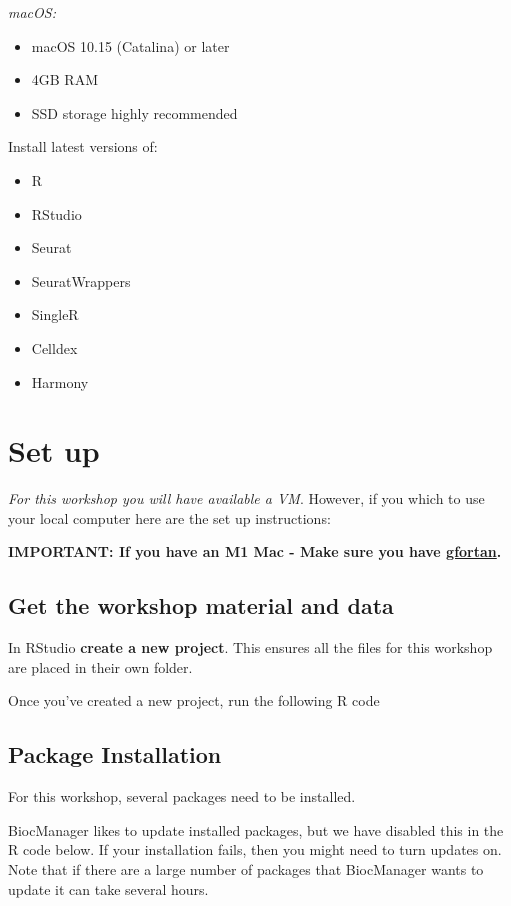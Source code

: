 \documentclass[
]{book}
\providecommand{\tightlist}{%
  \setlength{\itemsep}{0pt}\setlength{\parskip}{0pt}}
\begin{document}
\emph{macOS:}

\begin{itemize}
\tightlist
\item
  macOS 10.15 (Catalina) or later
\item
  4GB RAM
\item
  SSD storage highly recommended
\end{itemize}

Install latest versions of:

\begin{itemize}
\tightlist
\item
  R
\item
  RStudio
\item
  Seurat
\item
  SeuratWrappers
\item
  SingleR
\item
  Celldex
\item
  Harmony
\end{itemize}

\chapter{Set up}\label{set-up}

\emph{For this workshop you will have available a VM}. However, if you which to use your local computer here are the set up instructions:

\textbf{IMPORTANT: If you have an M1 Mac - Make sure you have \href{https://mac.r-project.org/tools/}{gfortan}.}

\section{Get the workshop material and data}\label{get-the-workshop-material-and-data}

In RStudio \textbf{create a new project}. This ensures all the files for this workshop are placed in their own folder.

Once you've created a new project, run the following R code

\section{Package Installation}\label{package-installation}

For this workshop, several packages need to be installed.

BiocManager likes to update installed packages, but we have disabled this in the R code below. If your installation fails, then you might need to turn updates on. Note that if there are a large number of packages that BiocManager wants to update it can take several hours.
\end{document}
